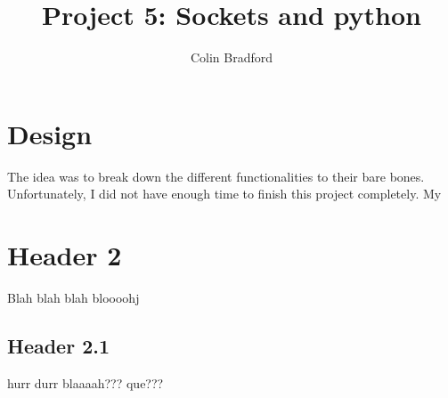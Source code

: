 \documentclass[11pt, oneside]{article}   	%
\title{Project 5: Sockets and python}
\author{Colin Bradford}
\begin{document}
\maketitle

	\section{Design}
	The idea was to break down the different functionalities to their bare bones. Unfortunately, I did not have enough time to finish this project completely.
	My 
	\section{Header 2}
	Blah blah blah
	bloooohj
	\subsection{Header 2.1}
	hurr durr blaaaah???
	que???
%
\end{document}
